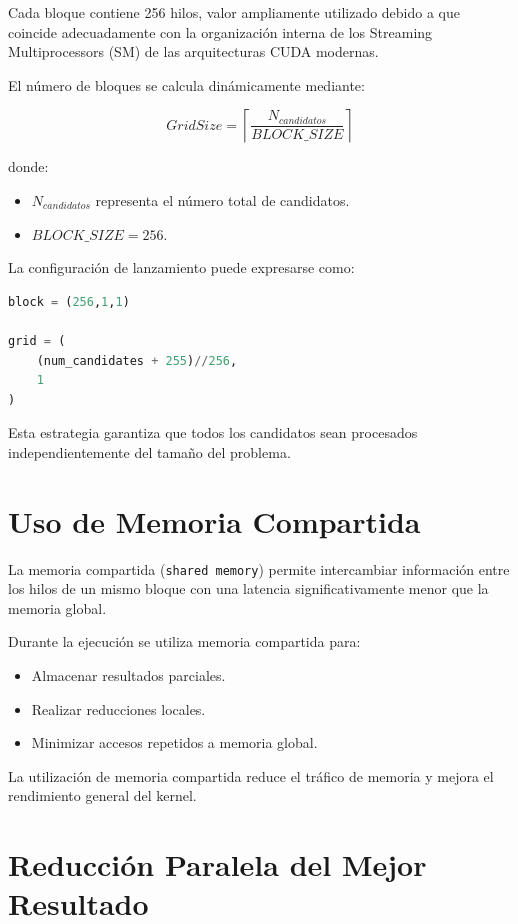 Cada bloque contiene 256 hilos, valor ampliamente utilizado debido a que coincide adecuadamente con la organización interna de los Streaming Multiprocessors (SM) de las arquitecturas CUDA modernas.

El número de bloques se calcula dinámicamente mediante:

\[
GridSize=
\left\lceil
\frac{N_{candidatos}}
{BLOCK\_SIZE}
\right\rceil
\]

donde:

\begin{itemize}
    \item $N_{candidatos}$ representa el número total de candidatos.
    \item $BLOCK\_SIZE = 256$.
\end{itemize}

La configuración de lanzamiento puede expresarse como:

\begin{lstlisting}[language=Python,
caption={Configuración de Grid y Blocks en PyCUDA},
label={lst:grid_configuration}]
block = (256,1,1)

grid = (
    (num_candidates + 255)//256,
    1
)
\end{lstlisting}

Esta estrategia garantiza que todos los candidatos sean procesados independientemente del tamaño del problema.

\section{Uso de Memoria Compartida}

La memoria compartida (\texttt{shared memory}) permite intercambiar información entre los hilos de un mismo bloque con una latencia significativamente menor que la memoria global.

Durante la ejecución se utiliza memoria compartida para:

\begin{itemize}
    \item Almacenar resultados parciales.
    \item Realizar reducciones locales.
    \item Minimizar accesos repetidos a memoria global.
\end{itemize}

La utilización de memoria compartida reduce el tráfico de memoria y mejora el rendimiento general del kernel.

\section{Reducción Paralela del Mejor Resultado}

